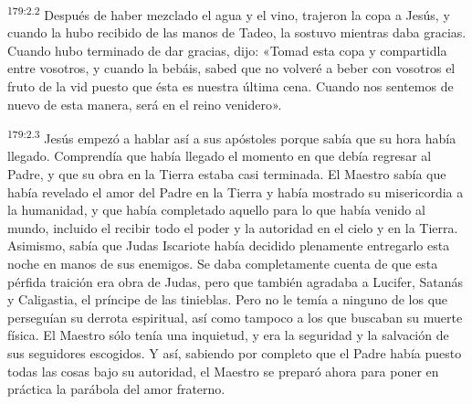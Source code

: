 \par 
\textsuperscript{179:2.2} Después de haber mezclado el agua y el vino, trajeron la copa a Jesús, y cuando la hubo recibido de las manos de Tadeo, la sostuvo mientras daba gracias. Cuando hubo terminado de dar gracias, dijo: «Tomad esta copa y compartidla entre vosotros, y cuando la bebáis, sabed que no volveré a beber con vosotros el fruto de la vid puesto que ésta es nuestra última cena. Cuando nos sentemos de nuevo de esta manera, será en el reino venidero».

\par 
\textsuperscript{179:2.3} Jesús empezó a hablar así a sus apóstoles porque sabía que su hora había llegado. Comprendía que había llegado el momento en que debía regresar al Padre, y que su obra en la Tierra estaba casi terminada. El Maestro sabía que había revelado el amor del Padre en la Tierra y había mostrado su misericordia a la humanidad, y que había completado aquello para lo que había venido al mundo, incluido el recibir todo el poder y la autoridad en el cielo y en la Tierra. Asimismo, sabía que Judas Iscariote había decidido plenamente entregarlo esta noche en manos de sus enemigos. Se daba completamente cuenta de que esta pérfida traición era obra de Judas, pero que también agradaba a Lucifer, Satanás y Caligastia, el príncipe de las tinieblas. Pero no le temía a ninguno de los que perseguían su derrota espiritual, así como tampoco a los que buscaban su muerte física. El Maestro sólo tenía una inquietud, y era la seguridad y la salvación de sus seguidores escogidos. Y así, sabiendo por completo que el Padre había puesto todas las cosas bajo su autoridad, el Maestro se preparó ahora para poner en práctica la parábola del amor fraterno.

